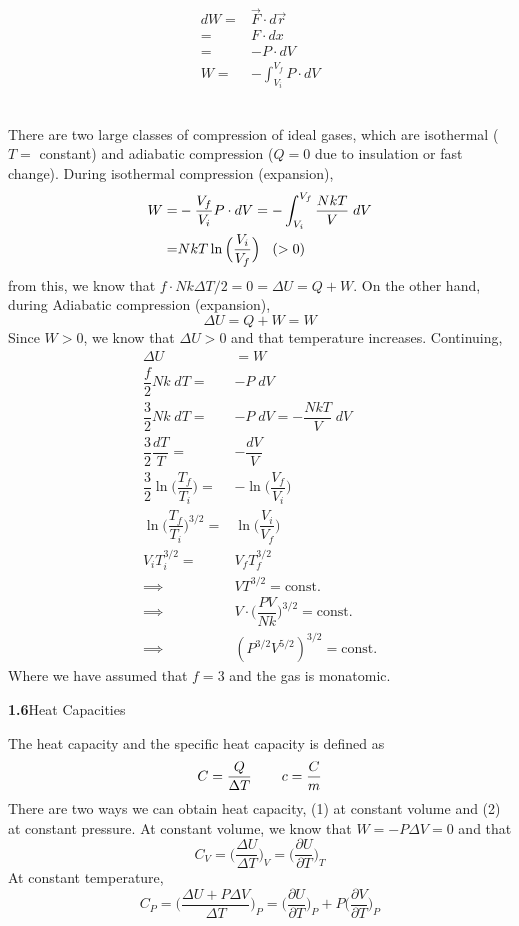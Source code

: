 \begin{align*}
	dW=&{\vec F}\cdot d{\vec r}\\
	=&F\cdot dx\\
	=&-P\cdot dV\\
W=&-\int _{V_{i}}^{V_{f}}P\cdot dV
\end{align*}
\\
\begin{defi}
There are two large classes of compression of ideal gases, which are isothermal ($T=$ constant) and adiabatic compression ($Q=0$\; due to insulation or fast change). During isothermal compression (expansion), 
\begin{align*}
	W=&-\dfrac{V_{f}}{V_{i}}P\cdot dV=-\int ^{V_{f}}_{V_{i}}\dfrac{NkT}{V}\;dV\\
	=&NkT\ln\Big(\dfrac{V_{i}}{V_{f}}\Big)\hspace{2ex}(>0)\\
\end{align*}
from this, we know that $f\cdot Nk\Delta T/2=0=\Delta U=Q+W$. On the other hand, during Adiabatic compression (expansion), 
\[\Delta U=Q+W=W\]
Since $W>0$, we know that $\Delta U>0$ and that temperature increases. Continuing,
\begin{align*}
	\Delta U&=W\\
	\dfrac{f}{2}Nk\;dT=&-P\;dV\\
	\dfrac{3}{2}Nk\;dT=&-P\;dV=-\dfrac{NkT}{V}\;dV\\
	\dfrac{3}{2}\dfrac{dT}{T}=&-\dfrac{dV}{V}\\
	\dfrac{3}{2}\ln\Big(\dfrac{T_{f}}{T_{i}}\Big)=&-\ln\Big(\dfrac{V_{f}}{V_{i}}\Big)\\
\ln\Big(\dfrac{T_{f}}{T_{i}}\Big)^{3/2}=&\ln\Big(\dfrac{V_{i}}{V_{f}}\Big)\\
V_{i}T_{i}^{3/2}=&V_{f}T_{f}^{3/2}\\
\implies& VT^{3/2}=\mathrm{const.}\\
\implies& V\cdot \Big(\dfrac{PV}{Nk}\Big)^{3/2}=\mathrm{const.}\\
	\implies &(P^{3/2}V^{5/2})^{3/2}=\mathrm{const.}
\end{align*}
Where we have assumed that $f=3$ and the gas is monatomic.
\end{defi}
\vspace{2ex}
{\bf 1.6}\hspace{2ex}Heat Capacities
\\
\begin{defi}
The heat capacity and the specific heat capacity is defined as
\[C=\dfrac{Q}{\Delta T}\hspace{5ex}c=\dfrac{C}{m}\]
There are two ways we can obtain heat capacity, (1) at constant volume and (2) at constant pressure. At constant volume, we know that $W=-P\Delta V=0$ and that
\[C_{V}=\Big(\dfrac{\Delta U}{\Delta T}\Big)_{V}=\Big(\dfrac{\partial U}{\partial T} \Big)_{T}\]
At constant temperature,
\[C_{P}=\Big(\dfrac{\Delta U+P\Delta V}{\Delta T}\Big)_{P}=\Big(\dfrac{\partial U}{\partial T} \Big)_{P}+P\Big(\dfrac{\partial V}{\partial T} \Big)_{P}\]
\end{defi}
